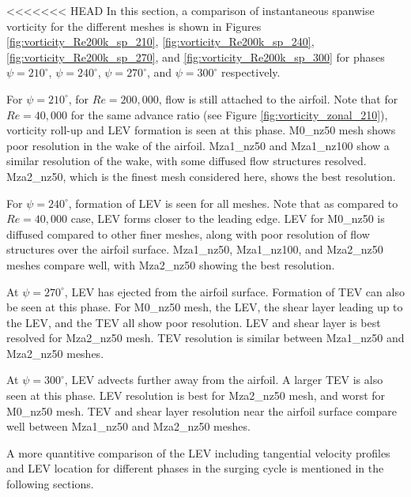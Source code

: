 <<<<<<< HEAD
In this section, a comparison of instantaneous spanwise vorticity for the different meshes is shown in Figures \ref{fig:vorticity_Re200k_sp_210}, \ref{fig:vorticity_Re200k_sp_240},  \ref{fig:vorticity_Re200k_sp_270}, and \ref{fig:vorticity_Re200k_sp_300} for phases $\psi=210^\circ$, $\psi=240^\circ$, $\psi=270^\circ$, and $\psi=300^\circ$ respectively. 

For $\psi=210^\circ$, for $Re=200,000$, flow is still attached to the airfoil. 
Note that for $Re=40,000$ for the same advance ratio (see Figure \ref{fig:vorticity_zonal_210}), vorticity roll-up and LEV formation is seen at this phase.
M0\_nz50 mesh shows poor resolution in the wake of the airfoil.
Mza1\_nz50 and Mza1\_nz100 show a similar resolution of the wake, with some diffused flow structures resolved.
Mza2\_nz50, which is the finest mesh considered here, shows the best resolution. 

For $\psi=240^\circ$, formation of LEV is seen for all meshes.
Note that as compared to $Re=40,000$ case, LEV forms closer to the leading edge.
LEV for M0\_nz50 is diffused compared to other finer meshes, along with poor resolution of flow structures over the airfoil surface.
Mza1\_nz50, Mza1\_nz100, and Mza2\_nz50 meshes compare well, with Mza2\_nz50 showing the best resolution.


At $\psi=270^\circ$, LEV has ejected from the airfoil surface. 
Formation of TEV can also be seen at this phase.
For M0\_nz50 mesh, the LEV, the shear layer leading up to the LEV, and the TEV all show poor resolution.
LEV and shear layer is best resolved for Mza2\_nz50 mesh.
TEV resolution is similar between Mza1\_nz50 and Mza2\_nz50 meshes.


At $\psi=300^\circ$, LEV advects further away from the airfoil. A larger TEV is also seen at this phase.
LEV resolution is best for Mza2\_nz50 mesh, and worst for M0\_nz50 mesh. 
TEV and shear layer resolution near the airfoil surface compare well between Mza1\_nz50 and Mza2\_nz50 meshes.


A more quantitive comparison of the LEV including tangential velocity profiles and LEV location for different phases in the surging cycle is mentioned in the following sections.



